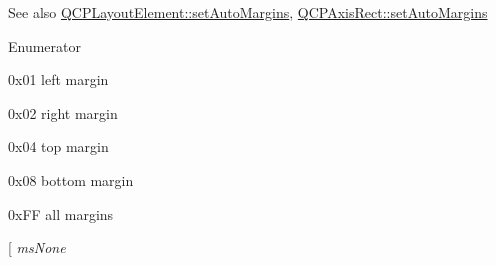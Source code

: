 \begin{DoxySeeAlso}{See also}
\hyperlink{class_q_c_p_layout_element_accfda49994e3e6d51ed14504abf9d27d}{Q\+C\+P\+Layout\+Element\+::set\+Auto\+Margins}, \hyperlink{class_q_c_p_layout_element_accfda49994e3e6d51ed14504abf9d27d}{Q\+C\+P\+Axis\+Rect\+::set\+Auto\+Margins} 
\end{DoxySeeAlso}
\begin{Desc}
\item[Enumerator]\par
\begin{description}
\item[{\em 
ms\+Left\hypertarget{namespace_q_c_p_a7e487e3e2ccb62ab7771065bab7cae54a9a47416a401c58f0c6219d17152757a9}{}\label{namespace_q_c_p_a7e487e3e2ccb62ab7771065bab7cae54a9a47416a401c58f0c6219d17152757a9}
}]{\ttfamily 0x01} left margin \item[{\em 
ms\+Right\hypertarget{namespace_q_c_p_a7e487e3e2ccb62ab7771065bab7cae54a75c2181d12e8b8346e2e99e1beb4b694}{}\label{namespace_q_c_p_a7e487e3e2ccb62ab7771065bab7cae54a75c2181d12e8b8346e2e99e1beb4b694}
}]{\ttfamily 0x02} right margin \item[{\em 
ms\+Top\hypertarget{namespace_q_c_p_a7e487e3e2ccb62ab7771065bab7cae54a19acab50954e500a120e251211ff39bf}{}\label{namespace_q_c_p_a7e487e3e2ccb62ab7771065bab7cae54a19acab50954e500a120e251211ff39bf}
}]{\ttfamily 0x04} top margin \item[{\em 
ms\+Bottom\hypertarget{namespace_q_c_p_a7e487e3e2ccb62ab7771065bab7cae54ae0bf0dc064e422ecd13970b6a5f6f0fb}{}\label{namespace_q_c_p_a7e487e3e2ccb62ab7771065bab7cae54ae0bf0dc064e422ecd13970b6a5f6f0fb}
}]{\ttfamily 0x08} bottom margin \item[{\em 
ms\+All\hypertarget{namespace_q_c_p_a7e487e3e2ccb62ab7771065bab7cae54a79334be9c93ef74c6211fee80487945a}{}\label{namespace_q_c_p_a7e487e3e2ccb62ab7771065bab7cae54a79334be9c93ef74c6211fee80487945a}
}]{\ttfamily 0x\+FF} all margins \item[{\em 
ms\+None\hypertarget{namespace_q_c_p_a7e487e3e2ccb62ab7771065bab7cae54a3108d916ac730d3b4ecdfc2911de2595}{}\label{namespace_q_c_p_a7e487e3e2ccb62ab7771065bab7cae54a3108d916ac730d3b4ecdfc2911de2595}
}
\end{description}
\end{Desc}
